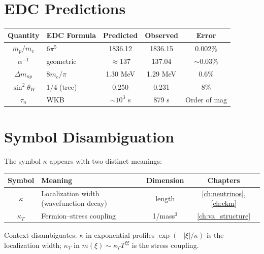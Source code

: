 \section{EDC Predictions}

\begin{center}
\begin{tabular}{clccc}
\toprule
\textbf{Quantity} & \textbf{EDC Formula} & \textbf{Predicted} & \textbf{Observed} & \textbf{Error} \\
\midrule
$m_p/m_e$ & $6\pi^5$ & 1836.12 & 1836.15 & 0.002\% \\
$\alpha^{-1}$ & geometric & $\approx 137$ & 137.04 & $\sim 0.03\%$ \\
$\Delta m_{np}$ & $8m_e/\pi$ & 1.30 MeV & 1.29 MeV & 0.6\% \\
$\sin^2\theta_W$ & $1/4$ (tree) & 0.250 & 0.231 & 8\% \\
$\tau_n$ & WKB & $\sim 10^3$ s & 879 s & Order of mag \\
\bottomrule
\end{tabular}
\end{center}

\section{Symbol Disambiguation}

The symbol $\kappa$ appears with two distinct meanings:

\begin{center}
\begin{tabular}{clcc}
\toprule
\textbf{Symbol} & \textbf{Meaning} & \textbf{Dimension} & \textbf{Chapters} \\
\midrule
$\kappa$ & Localization width (wavefunction decay) & length & \ref{ch:neutrinos}, \ref{ch:ckm} \\
$\kappa_T$ & Fermion--stress coupling & 1/mass$^3$ & \ref{ch:va_structure} \\
\bottomrule
\end{tabular}
\end{center}

Context disambiguates: $\kappa$ in exponential profiles $\exp(-|\xi|/\kappa)$ is the
localization width; $\kappa_T$ in $m(\xi) \sim \kappa_T T^{\xi\xi}$ is the stress coupling.

